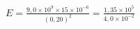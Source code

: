 \documentclass[preview,border=1pt,12pt]{standalone}
\begin{document}
$\displaystyle E = \frac{9{,}0 \times 10^{9} \times 15 \times 10^{-6}}{(0{,}20)^{2}} = \frac{1{,}35 \times 10^{5}}{4{,}0 \times 10^{-2}}$
\end{document}
